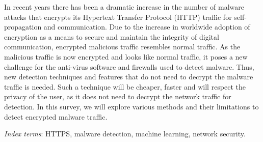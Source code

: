 In recent years there has been a dramatic increase in the number of malware attacks that encrypts its Hypertext Transfer Protocol (HTTP) traffic for self-propagation and communication. Due to the increase in worldwide adoption of encryption as a means to secure and maintain the integrity of digital communication, encrypted malicious traffic resembles normal traffic. As the malicious traffic is now encrypted and looks like normal traffic, it poses a new challenge for the anti-virus software and firewalls used to detect malware. Thus, new detection techniques and features that do not need to decrypt the malware traffic is needed. Such a technique will be cheaper, faster and will respect the privacy of the user, as it does not need to decrypt the network traffic for detection. In this survey, we will explore various methods and their limitations to detect encrypted malware traffic.

\emph{Index terms}: HTTPS, malware detection, machine learning, network security.